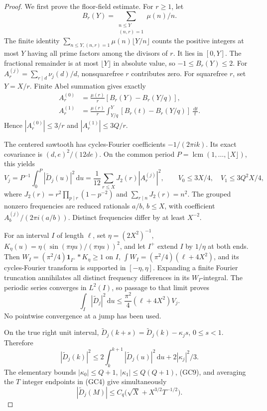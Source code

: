 \documentclass[11pt]{article}
\theoremstyle{remark}\newtheorem{remark}[theorem]{Remark}
\newcommand{\dd}{\,\mathrm d}
\begin{document}
\begin{proof}
We first prove the floor-field estimate. For \(r\ge1\), let
\[
 B_r(Y)=\sum_{\substack{n\le Y\\(n,r)=1}}\mu(n)/n .
\]
The finite identity
\(\sum_{n\le Y,(n,r)=1}\mu(n)\lfloor Y/n\rfloor\)
counts the positive integers at most \(Y\) having all prime
factors among the divisors of \(r\). It lies in \([0,Y]\).
The fractional remainder is at most \(\lfloor Y\rfloor\)
in absolute value, so \(-1\le B_r(Y)\le2\).
For \(A_r^{(j)}=\sum_{r\mid d}\nu_j(d)/d\), nonsquarefree
\(r\) contributes zero. For squarefree \(r\), set \(Y=X/r\).
Finite Abel summation gives exactly
\[
 \begin{split}
 A_r^{(0)}&=\frac{\mu(r)}r[B_r(Y)-B_r(Y/q)],\\
 A_r^{(1)}&=\frac{\mu(r)}r\int_{Y/q}^{Y}
                   [B_r(t)-B_r(Y/q)]\,\frac{\dd t}{t}.
 \end{split}
 \tag{GC7}
\]
Hence \(|A_r^{(0)}|\le3/r\) and
\(|A_r^{(1)}|\le3Q/r\).

The centered sawtooth has cycles-Fourier coefficients
\(-1/(2\pi i k)\). Its exact covariance is
\((d,e)^2/(12de)\). On the common period
\(P=\operatorname{lcm}(1,\ldots,\lfloor X\rfloor)\), this yields
\[
 V_j=P^{-1}\int_0^P|\widetilde D_j(u)|^2\dd u
       =\frac1{12}\sum_{r\le X}J_2(r)|A_r^{(j)}|^2,\qquad
 V_0\le3X/4,\quad V_1\le3Q^2X/4,
 \tag{GC8}
\]
where \(J_2(r)=r^2\prod_{p\mid r}(1-p^{-2})\) and
\(\sum_{r\mid n}J_2(r)=n^2\).
The grouped nonzero frequencies are reduced rationals \(a/b\),
\(b\le X\), with coefficient
\(A_b^{(j)}/(2\pi i(a/b))\).
Distinct frequencies differ by at least \(X^{-2}\).

For an interval \(I\) of length \(\ell\), set
\(\eta=(2X^2)^{-1}\), \(K_\eta(u)=\eta
(\sin(\pi\eta u)/(\pi\eta u))^2\), and let \(I^+\) extend
\(I\) by \(1/\eta\) at both ends. Then
\(W_I=(\pi^2/4)\mathbf1_{I^+}*K_\eta\ge1\) on \(I\),
\(\int W_I=(\pi^2/4)(\ell+4X^2)\), and its cycles-Fourier
transform is supported in \([-\eta,\eta]\).
Expanding a finite Fourier truncation annihilates all distinct
frequency differences in its \(W_I\)-integral.
The periodic series converges in \(L^2(I)\), so passage to
that limit proves
\[
 \int_I|\widetilde D_j|^2\dd u
       \le\frac{\pi^2}{4}(\ell+4X^2)V_j .
 \tag{GC9}
\]
No pointwise convergence at a jump has been used.

On the true right unit interval,
\(\widetilde D_j(k+s)=\widetilde D_j(k)-\kappa_js\),
\(0\le s<1\). Therefore
\[
 |\widetilde D_j(k)|^2
 \le2\int_k^{k+1}|\widetilde D_j(u)|^2\dd u
                                      +2|\kappa_j|^2/3 .
\]
The elementary bounds
\(|\kappa_0|\le Q+1\), \(|\kappa_1|\le Q(Q+1)\),
(GC9), and averaging the \(T\) integer endpoints in
(GC4) give simultaneously
\[
 |\widetilde D_j(M)|\le C_q
                  \bigl(\sqrt X+X^{3/2}T^{-1/2}\bigr).
 \tag{GC10}
\]


\end{proof}
\end{document}
